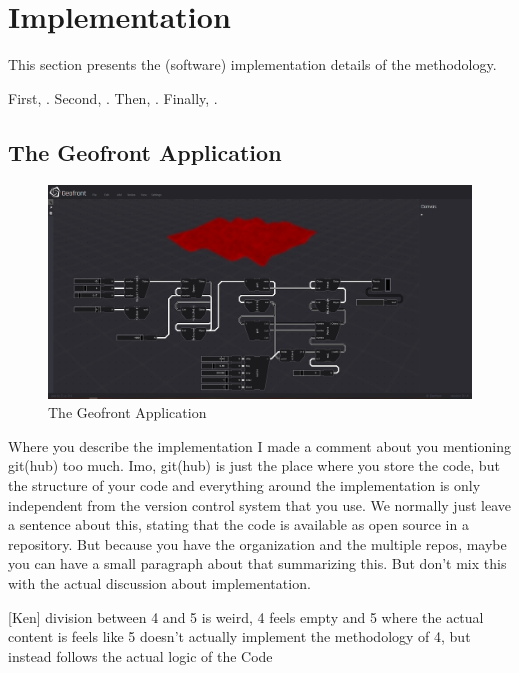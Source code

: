 \chapter{Implementation}%
\label{chap:implementation}
This section presents the (software) implementation details of the methodology.

First, .
Second, .
Then, .
Finally, .

\section{The Geofront Application}

\begin{figure}
  \centering
  \graphicspath{ {../../assets/images/implementation/} }
  \includegraphics[width=\linewidth]{full-application.png}
  \caption[Geofront]{The Geofront Application}
  \label{fig:geofront-app}
\end{figure}

\begin{note}
  [Stelios]  Where you describe the implementation I made a comment about you mentioning git(hub) too much. Imo, git(hub) is just the place where you store the code, but the structure of your code and everything around the implementation is only independent from the version control system that you use. We normally just leave a sentence about this, stating that the code is available as open source in a repository. But because you have the organization and the multiple repos, maybe you can have a small paragraph about that summarizing this. But don't mix this with the actual discussion about implementation.

  [Ken] division between 4 and 5 is weird, 4 feels empty and 5 where the actual content is  feels like 5 doesn't actually implement the methodology of 4, but instead follows the actual logic of the Code
  
\end{note}

